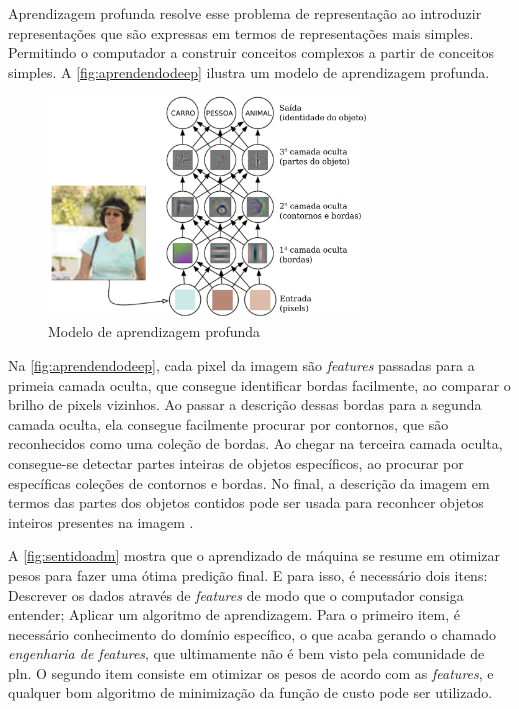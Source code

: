 Aprendizagem profunda resolve esse problema de representação ao introduzir representações que são expressas em termos de representações mais simples. Permitindo o computador a construir conceitos complexos a partir de conceitos simples. A \autoref{fig:aprendendodeep} ilustra um modelo de aprendizagem profunda.

\begin{figure}
\centering
\caption{Modelo de aprendizagem profunda} \label{fig:aprendendodeep}
\includegraphics[width=0.75\textwidth]{img/aprendendodeep.pdf}
\end{figure}

Na \autoref{fig:aprendendodeep}, cada pixel da imagem são \textit{features} passadas para a primeia camada oculta, que consegue identificar bordas facilmente, ao comparar o brilho de pixels vizinhos. Ao passar a descrição dessas bordas para a segunda camada oculta, ela consegue facilmente procurar por contornos, que são reconhecidos como uma coleção de bordas. Ao chegar na terceira camada oculta, consegue-se detectar partes inteiras de objetos específicos, ao procurar por específicas coleções de contornos e bordas. No final, a descrição da imagem em termos das partes dos objetos contidos pode ser usada para reconhcer objetos inteiros presentes na imagem \cite{bengio2015deep}.


A \autoref{fig:sentidoadm} mostra que o aprendizado de máquina se resume em otimizar pesos para fazer uma ótima predição final. E para isso, é necessário dois itens: Descrever os dados através de \textit{features} de modo que o computador consiga entender; Aplicar um algoritmo de aprendizagem. Para o primeiro item, é necessário conhecimento do domínio específico, o que acaba gerando o chamado \textit{engenharia de features}, que ultimamente não é bem visto pela comunidade de \ac{pln}. O segundo item consiste em otimizar os pesos de acordo com as \textit{features}, e qualquer bom algoritmo de minimização da função de custo pode ser utilizado.


